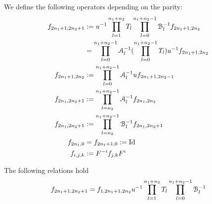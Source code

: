 \documentclass{amsart}
\begin{document}
\begin{defn}
We define the following operators depending on the parity:
\[
\begin{aligned}
f_{2n_1+1,2n_2+1}&:=u^{-1}\prod^{n_1+n_2}_{l=1}T_{l}\prod^{n_1+n_2-1}_{l=0}\mathcal{B}^{-1}_l f_{2n_1+1,2n_2}\\
&=\prod^{n_1+n_2-1}_{l=0}\mathcal{A}^{-1}_l(\prod^{n_1+n_2-1}_{l=0}T_{l} )u^{-1}f_{2n_1+1,2n_2}\\
f_{2n_1+1,2n_2}&:=\prod^{n_1+n_2-1}_{l=0}\mathcal{A}^{-1}_l uf_{2n_1+1,2n_2-1}\\
f_{2n_1,2n_2+1}&:=\prod^{n_1+n_2-1}_{l=n_2} \mathcal{A}^{-1}_lf_{2n_1,2n_2}\\
f_{2n_1,2n_2+1}&:=\prod^{n_1+n_2-1}_{l=n_2}\mathcal{B}^{-1}_lf_{2n_1,2n_2+1}\\
f_{2n_1,0}&=f_{2n_1+1,0}:=\operatorname{Id}\\
f_{i,j,k}&:=F^{-i}f_{j,k}F^{i}
\end{aligned}
\]
\end{defn}

\begin{lem}
The following relations hold
\[
\begin{aligned}
 f_{2n_1+1,2n_2+1}= f_{1,2n_1+1,2n_2}u^{-1}\prod^{n_1+n_2}_{l=1}T_{l}\prod^{n_1+n_2-1}_{l=0}\mathcal{B}^{-1}_l 
\end{aligned}
\]
\end{lem}
\end{document}
